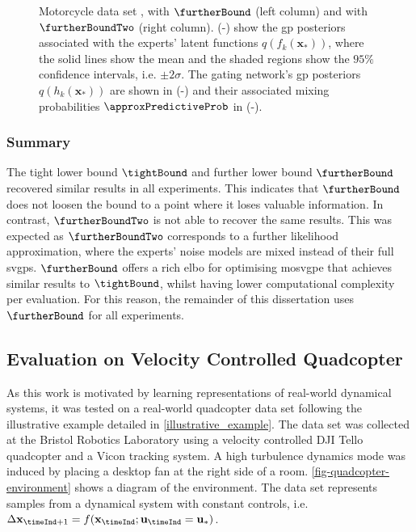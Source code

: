 \documentclass{mimosis-class/mimosis}
\numberwithin{equation}{chapter}
\newcommand{\modeInd}{\ensuremath{k}}
\newcommand{\mode}[1]{\ensuremath{#1_{\modeInd}}}
\newcommand{\state}{\ensuremath{\mathbf{x}}}
\newcommand{\control}{\ensuremath{\mathbf{u}}}
\newcommand{\latentFunc}{\ensuremath{f}}
\begin{document}
{\begin{figure}[hbt!]
{Motorcycle data set \citep{Silverman1985}, with $\furtherBound$ (left column)
and with $\furtherBoundTwo$ (right column).
(-) show the \acrshort{gp}
posteriors associated with the experts' latent functions $q(\mode{\latentFunc}(\state_*))$,
where the solid lines show the mean and the shaded regions show the $95\%$ confidence intervals, i.e. $\pm2\sigma$.
The gating network's \acrshort{gp} posteriors $q(h_{k}(\state_*))$ are shown in
(-) and
their associated mixing probabilities $\approxPredictiveProb$ in
(-).}
\label{fig-latent-mcycle-three-experts}
\end{figure}
\clearpage

\subsubsection{Summary}
\label{sec:orgc584f78}
The tight lower bound \(\tightBound\) and further lower bound \(\furtherBound\) recovered similar results in
all experiments.
This indicates that \(\furtherBound\) does not loosen the bound to a point where it loses valuable information.
In contrast, \(\furtherBoundTwo\) is not able to recover the same results.
This was expected as \(\furtherBoundTwo\) corresponds to a further likelihood approximation, where
the experts' noise models are mixed instead of their full \acrshort{svgp}s.
\(\furtherBound\) offers a rich \acrshort{elbo} for optimising \acrshort{mosvgpe} that achieves similar results to \(\tightBound\),
whilst having lower computational complexity per evaluation.
For this reason, the remainder of this dissertation uses \(\furtherBound\) for all experiments.

\newpage

\subsection{Evaluation on Velocity Controlled Quadcopter \label{sec-brl-experiment}}
\label{sec:org4b51d02}
As this work is motivated by learning representations of real-world dynamical systems, it was
tested on a real-world quadcopter data set following the illustrative example detailed
in \cref{illustrative_example}.
The data set was collected at the Bristol Robotics Laboratory using
a velocity controlled DJI Tello quadcopter and a Vicon tracking system.
A high turbulence dynamics mode was induced by placing a desktop fan at the right side of a room.
\cref{fig-quadcopter-environment} shows a diagram of the environment.
The data set represents samples from a dynamical system with constant controls, i.e.
\(\Delta\state_{\timeInd+1} = \latentFunc(\state_{\timeInd};\control_{\timeInd}=\control_*)\).

}
\end{document}
